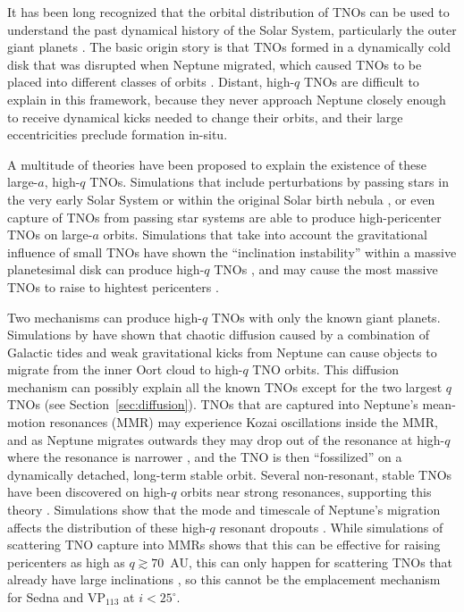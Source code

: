 \documentclass{aastex62}
\begin{document}
It has been long recognized that the orbital distribution of TNOs can be used to understand the past dynamical history of the Solar System, particularly the outer giant planets \citep{malhotra93,levison08}.
The basic origin story is that TNOs formed in a dynamically cold disk that was disrupted when Neptune migrated, which caused TNOs to be placed into different classes of orbits \citep[see][]{gladman08}.  
Distant, high-$q$ TNOs are difficult to explain in this framework, because they never approach Neptune closely enough to receive dynamical kicks needed to change their orbits, and their large eccentricities preclude formation in-situ.  

A multitude of theories have been proposed to explain the existence of these large-$a$, high-$q$ TNOs.
Simulations that include perturbations by passing stars in the very early Solar System \citep{kenyonbromley04,morbidellilevison04,KaibQuinn2008,Pfalzneretal2018} or within the original Solar birth nebula \citep{brasser12,brasserschwamb15}, or even capture of TNOs from passing star systems \citep{kenyonbromley04,Jilkovaetal2015} are able to produce high-pericenter TNOs on large-$a$ orbits.
Simulations that take into account the gravitational influence of small TNOs have shown the ``inclination instability'' within a massive planetesimal disk can produce high-$q$ TNOs \citep{madigan2016}, and may cause the most massive TNOs to raise to hightest pericenters \citep{Fleisigetal2018}.

Two mechanisms can produce high-$q$ TNOs with only the known giant planets.
Simulations by \citet{bannister17} have shown that chaotic diffusion caused by a combination of Galactic tides and weak gravitational kicks from Neptune can cause objects to migrate from the inner Oort cloud to high-$q$ TNO orbits. 
This diffusion mechanism can possibly explain all the known TNOs except for the two largest $q$ TNOs (see Section~\ref{sec:diffusion}).
TNOs that are captured into Neptune's mean-motion resonances (MMR) may experience Kozai oscillations inside the MMR, and as Neptune migrates outwards they may drop out of the resonance at high-$q$ where the resonance is narrower \citep{gomes03}, and the TNO is then ``fossilized'' on a dynamically detached, long-term stable orbit.
Several non-resonant, stable TNOs have been discovered on high-$q$ orbits near strong resonances, supporting this theory \citep{pike15,lawler18res}.
Simulations show that the mode and timescale of Neptune's migration affects the distribution of these high-$q$ resonant dropouts \citep{Nesvornyetal2016,kaib16}.
While simulations of scattering TNO capture into MMRs shows that this can be effective for raising pericenters as high as $q\gtrsim70$~AU, this can only happen for scattering TNOs that already have large inclinations \citep{gallardo12}, so this cannot be the emplacement mechanism for Sedna and VP$_{113}$ at $i<25^{\circ}$.
\end{document}

